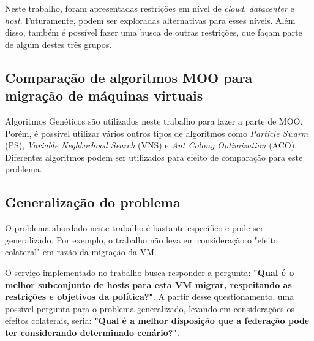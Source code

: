 Neste trabalho, foram apresentadas restrições em nível de \textit{cloud},
\textit{datacenter} e \textit{host}. Futuramente, podem ser exploradas
alternativas para esses níveis. Além disso, também é possível fazer
uma busca de outras restrições, que façam parte de algum destes
três grupos.

\subsection{Comparação de algoritmos MOO para migração de máquinas virtuais}

Algoritmos Genéticos são utilizados neste trabalho para fazer a parte
de MOO. Porém, é possível utilizar vários outros tipos de algoritmos como
\textit{Particle Swarm} (PS), \textit{Variable Neghborhood Search} (VNS) e
\textit{Ant Colony Optimization} (ACO). Diferentes algoritmos podem ser utilizados 
para efeito de comparação para este problema. 

\subsection{Generalização do problema}

O problema abordado neste trabalho é bastante específico e pode ser 
generalizado. Por exemplo, o trabalho não leva em consideração o "efeito colateral"
em razão da migração da VM.

O serviço implementado no trabalho busca responder a pergunta: 
\textbf{"Qual é o melhor subconjunto de hosts para esta VM migrar, respeitando as
restrições e objetivos da política?"}. A partir desse questionamento, uma possível
pergunta para o problema generalizado, levando em considerações os efeitos colaterais,
seria: \textbf{"Qual é a melhor disposição que a federação pode ter considerando
determinado cenário?"}.